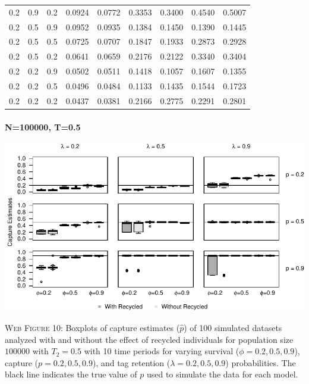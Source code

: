 \documentclass[]{article}
\let\oldparagraph\paragraph
\renewcommand{\paragraph}[1]{\oldparagraph{#1}\mbox{}}
\begin{document}
\begin{table}[ht]
{\begin{tabular}{rrrrrrrrr}
  0.2 & 0.9 & 0.2 & 0.0924 & 0.0772 & 0.3353 & 0.3400 & 0.4540 & 0.5007 \\ 
  0.2 & 0.5 & 0.9 & 0.0952 & 0.0935 & 0.1384 & 0.1450 & 0.1390 & 0.1445 \\ 
  0.2 & 0.5 & 0.5 & 0.0725 & 0.0707 & 0.1847 & 0.1933 & 0.2873 & 0.2928 \\ 
  0.2 & 0.5 & 0.2 & 0.0641 & 0.0659 & 0.2176 & 0.2122 & 0.3340 & 0.3404 \\ 
  0.2 & 0.2 & 0.9 & 0.0502 & 0.0511 & 0.1418 & 0.1057 & 0.1607 & 0.1355 \\ 
  0.2 & 0.2 & 0.5 & 0.0496 & 0.0484 & 0.1133 & 0.1435 & 0.1544 & 0.1723 \\ 
  0.2 & 0.2 & 0.2 & 0.0437 & 0.0381 & 0.2166 & 0.2775 & 0.2291 & 0.2801 \\ 
   \hline
\end{tabular}
}
\endgroup
\end{table}

\newpage

\paragraph{N=100000, T=0.5}\label{n100000-t0.5-1}

\includegraphics{Appendix_BW_files/figure-latex/figure10_capture_GJSTL3-1.pdf}

\textsc{Web Figure 10:} Boxplots of capture estimates (\(\hat{p}\)) of
100 simulated datasets analyzed with and without the effect of recycled
individuals for population size \(100000\) with \(T_2=0.5\) with 10 time
periods for varying survival (\(\phi=0.2,0.5,0.9\)), capture
(\(p=0.2,0.5,0.9\)), and tag retention (\(\lambda=0.2,0.5,0.9\))
probabilities. The black line indicates the true value of \(p\) used to
simulate the data for each model.
\end{document}

